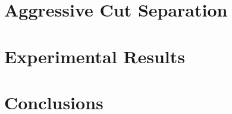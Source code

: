 \documentclass[preprint,12pt]{elsarticle}
\begin{document}
%
%
%
%
%
%
%
%
%
%
%

\section{Aggressive Cut Separation}\label{cuts}

\section{Experimental Results}\label{experiments}

\section{Conclusions}\label{conclusions}

\end{document}
